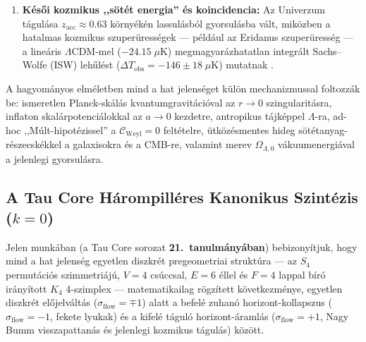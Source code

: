 \documentclass[11pt,a4paper]{article}
\theoremstyle{remark}
\begin{document}
\begin{enumerate}
  \item \textbf{K\'es\H{o}i kozmikus ,,s\"ot\'et energia'' \'es koincidencia:} Az Univerzum t\'agul\'asa $z_{\mathrm{acc}} \approx 0.63$ k\"orny\'ek\'en lassul\'asb\'ol gyorsul\'asba v\'alt, mik\"ozben a hatalmas kozmikus szuper\"uress\'egek --- p\'eld\'aul az Eridanus szuper\"uress\'eg --- a line\'aris $\Lambda\mathrm{CDM}$-mel ($-24.15\;\mu\mathrm{K}$) megmagyar\'azhatatlan integr\'alt Sachs--Wolfe (ISW) leh\H{u}l\'est ($\Delta T_{\mathrm{obs}} = -146 \pm 18\;\mu\mathrm{K}$) mutatnak \cite{Kovacs2022Eridanus}.
\end{enumerate}

A hagyom\'anyos elm\'eletben mind a hat jelens\'eget k\"ul\"on mechanizmussal foltozz\'ak be: ismeretlen Planck-sk\'al\'as kvantumgravit\'aci\'oval az $r \to 0$ szingularit\'asra, inflaton skal\'arpotenci\'alokkal az $a \to 0$ kezdetre, antropikus t\'ajk\'eppel $\Lambda$-ra, ad-hoc ,,M\'ult-hipot\'ezissel'' a $\mathcal{C}_{\mathrm{Weyl}} = 0$ felt\'etelre, \"utk\"oz\'esmentes hideg s\"ot\'etanyag-r\'eszecsk\'ekkel a galaxisokra \'es a CMB-re, valamint merev $\Omega_{\Lambda,0}$ v\'akuumenergi\'aval a jelenlegi gyorsul\'asra.

\subsection{A Tau Core H\'arompill\'eres Kanonikus Szint\'ezis (\texorpdfstring{$k = 0$}{k = 0})}

Jelen munk\'aban (a Tau Core sorozat \textbf{21.\ tanulm\'any\'aban}) bebizony\'itjuk, hogy mind a hat jelens\'eg egyetlen diszkr\'et pregeometriai strukt\'ura --- az $S_4$ permut\'aci\'os szimmetri\'aj\'u, $V = 4$ cs\'uccsal, $E = 6$ \'ellel \'es $F = 4$ lappal b\'ir\'o ir\'any\'itott $K_4$ 4-szimplex \cite{JolcsakTauFoundationSeries2026,JolcsakTauPaper20Euclid2026} --- matematikailag r\"ogz\'itett k\"ovetkezm\'enye, egyetlen diszkr\'et el\H{o}jelv\'alt\'as ($\sigma_{\mathrm{flow}} = \mp 1$) alatt a befel\'e zuhan\'o horizont-kollapszus ($\sigma_{\mathrm{flow}} = -1$, fekete lyukak) \'es a kifel\'e t\'agul\'o horizont-áraml\'as ($\sigma_{\mathrm{flow}} = +1$, Nagy Bumm visszapattan\'as \'es jelenlegi kozmikus t\'agul\'as) k\"oz\"ott.
\end{document}
